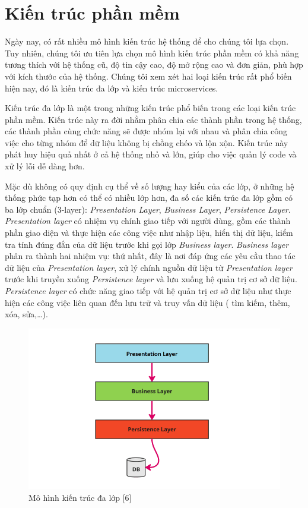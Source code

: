 \section{Kiến trúc phần mềm}

Ngày nay, có rất nhiều mô hình kiến trúc hệ thống để cho chúng tôi lựa chọn.
Tuy nhiên, chúng tôi ưu tiên lựa chọn mô hình kiến trúc phần mềm có khả năng
tương thích với hệ thống cũ, độ tin cậy cao, độ mở rộng cao và đơn giản, phù hợp với
kích thước của hệ thống. Chúng tôi xem xét hai loại kiến trúc rất phổ biến hiện nay, đó là 
kiến trúc đa lớp và kiến trúc microservices.

\par
Kiến trúc đa lớp là một trong những kiến trúc phổ biến trong các loại kiến trúc phần mềm. Kiến trúc
này ra đời nhằm phân chia các thành phần trong hệ thống, các thành phần cùng
chức năng sẽ được nhóm lại với nhau và phân chia công việc cho từng nhóm để dữ
liệu không bị chồng chéo và lộn xộn. Kiến trúc này phát huy hiệu quả nhất ở cả hệ 
thống nhỏ và lớn, giúp cho việc quản lý code và xử lý lỗi dễ
dàng hơn.
\par
Mặc dù không có quy định cụ thể về số lượng hay kiểu của các lớp, ở những hệ
thống phức tạp hơn có thể có nhiều lớp hơn, đa số các kiến trúc đa lớp gồm có
ba lớp chuẩn (3-layer): \emph{Presentation Layer}, \emph{Business Layer},
\emph{Persistence Layer}. \emph{Presentation layer} có nhiệm vụ chính giao tiếp với
người dùng, gồm các thành phần giao diện và thực hiện các công việc như nhập
liệu, hiển thị dữ liệu, kiểm tra tính đúng đắn của dữ liệu trước khi gọi lớp
\emph{Business layer}. \emph{Business layer} phân ra thành hai nhiệm vụ: thứ
nhất, đây là nơi đáp ứng các yêu cầu thao tác dữ liệu của \emph{Presentation
    layer}, xử lý chính nguồn dữ liệu từ \emph{Presentation layer} trước khi truyền
xuống \emph{Persistence layer} và lưu xuống hệ quản trị cơ sở dữ liệu. \emph{Persistence 
layer} có chức năng giao tiếp với hệ quản trị cơ sở dữ liệu như thực hiện các công việc
liên quan đến lưu trữ và truy vấn dữ liệu ( tìm kiếm, thêm, xóa, sửa,…).
\begin{figure}[H]
    \centering
    \includegraphics[width=\linewidth]{Content/Phân tích và thiết kế hệ thống/documents/Kiến trúc hệ thống/images/n tier architecture.png}
    \vspace{0.5cm}
    \caption{Mô hình kiến trúc đa lớp [6]}
    \label{fig:Mô hình kiến trúc đa lớp}
\end{figure}
